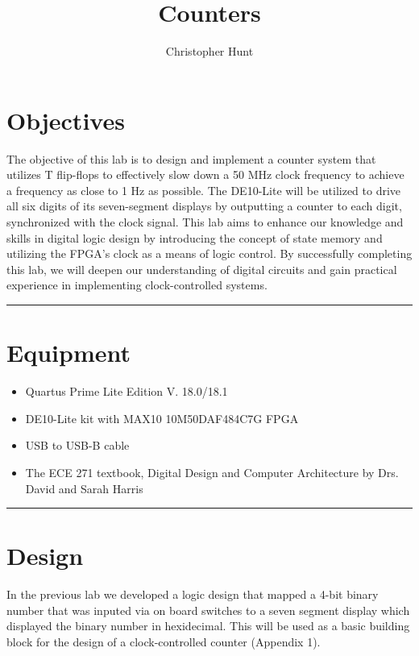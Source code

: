 \documentclass{article}
\title{\textbf{{\huge Counters}}}
\author{Christopher Hunt}
\date{}
\begin{document}
\pagestyle{fancy}
\fancyhf{}
\rhead{\thepage}
\maketitle
\section*{\textcolor{mycolor}{Objectives}}
The objective of this lab is to design and implement a counter system that utilizes T flip-flops to effectively slow down a 50 MHz clock frequency to achieve a frequency as close to 1 Hz as possible. The DE10-Lite will be utilized to drive all six digits of its seven-segment displays by outputting a counter to each digit, synchronized with the clock signal. This lab aims to enhance our knowledge and skills in digital logic design by introducing the concept of state memory and utilizing the FPGA's clock as a means of logic control. By successfully completing this lab, we will deepen our understanding of digital circuits and gain practical experience in implementing clock-controlled systems.

\vspace{5mm}
\hrule

\section*{\textcolor{mycolor}{Equipment}}
\begin{itemize}
  \item Quartus Prime Lite Edition V. 18.0/18.1
  \item DE10-Lite kit with MAX10 10M50DAF484C7G FPGA
  \item USB to USB-B cable
  \item The ECE 271 textbook, Digital Design and Computer Architecture by Drs. David and Sarah Harris
\end{itemize}
\vspace{5mm}
\hrule

\section*{\textcolor{mycolor}{Design}}
In the previous lab we developed a logic design that mapped a 4-bit binary number that was inputed via on board switches to a seven segment display which displayed the binary number in hexidecimal. This will be used as a basic building block for the design of a clock-controlled counter (Appendix 1). 
\end{document}
